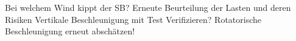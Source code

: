 Bei welchem Wind kippt der SB?
Erneute Beurteilung der Lasten und deren Risiken
Vertikale Beschleunigung mit Test Verifizieren?
Rotatorische Beschleunigung erneut abschätzen!

